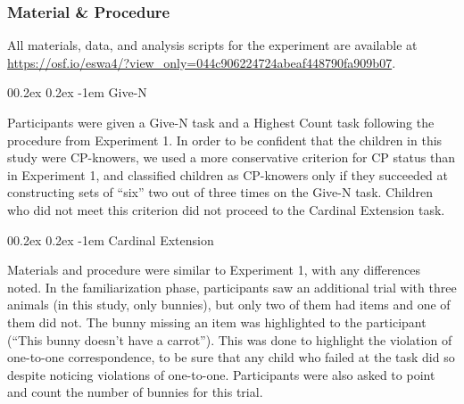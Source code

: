 \documentclass[
  man,floatsintext]{apa7}
\makeatletter
\let\oldparagraph\paragraph
\renewcommand{\paragraph}{
    \@ifstar
      \xxxParagraphStar
      \xxxParagraphNoStar
  }
\newcommand{\xxxParagraphStar}[1]{\oldparagraph*{#1}\mbox{}}
\newcommand{\xxxParagraphNoStar}[1]{\oldparagraph{#1}\mbox{}}
\renewcommand{\paragraph}{\@startsection{paragraph}{4}{\parindent}%
  {0\baselineskip \@plus 0.2ex \@minus 0.2ex}%
  {-1em}%
  {\normalfont\normalsize\bfseries\itshape\typesectitle}}
\renewcommand{\paragraph}{\@startsection{paragraph}{4}{\parindent}%
  {0\baselineskip \@plus 0.2ex \@minus 0.2ex}%
  {-1em}%
  {\normalfont\normalsize\bfseries\typesectitle}}
\makeatother
\begin{document}
\subsubsection{Material \& Procedure}\label{material-procedure-1}

All materials, data, and analysis scripts for the experiment are available at \url{https://osf.io/eswa4/?view_only=044c906224724abeaf448790fa909b07}.

\paragraph{Give-N}\label{give-n-1}

Participants were given a Give-N task and a Highest Count task following the procedure from Experiment 1. In order to be confident that the children in this study were CP-knowers, we used a more conservative criterion for CP status than in Experiment 1, and classified children as CP-knowers only if they succeeded at constructing sets of ``six'' two out of three times on the Give-N task. Children who did not meet this criterion did not proceed to the Cardinal Extension task.

\paragraph{Cardinal Extension}\label{cardinal-extension-1}

Materials and procedure were similar to Experiment 1, with any differences noted. In the familiarization phase, participants saw an additional trial with three animals (in this study, only bunnies), but only two of them had items and one of them did not. The bunny missing an item was highlighted to the participant (``This bunny doesn't have a carrot''). This was done to highlight the violation of one-to-one correspondence, to be sure that any child who failed at the task did so despite noticing violations of one-to-one. Participants were also asked to point and count the number of bunnies for this trial.
\end{document}
